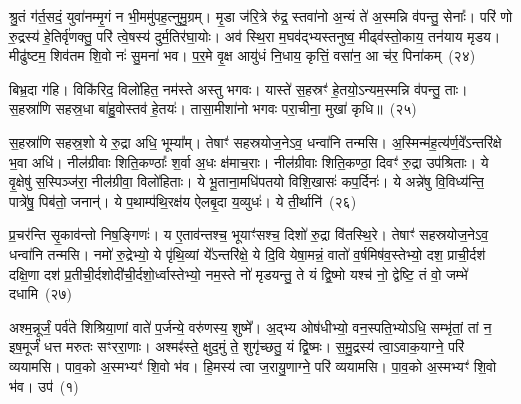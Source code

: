श्रु॒तं ग॑र्त॒सदं॒ युवा॑नम्मृ॒गं न भी॒ममु॑पह॒त्नुमु॒ग्रम्। मृ॒डा ज॑रि॒त्रे रु॑द्र॒ स्तवा॑नो अ॒न्यं ते॑ अ॒स्मन्नि व॑पन्तु॒ सेनाः᳚। परि॑ णो रु॒द्रस्य॑ हे॒तिर्वृ॑णक्तु॒ परि॑ त्वे॒षस्य॑ दुर्म॒तिर॑घा॒योः। अव॑ स्थि॒रा म॒घव॑द्भ्यस्तनुष्व॒ मीढ्व॑स्तो॒काय॒ तन॑याय मृडय। मीढु॑ष्टम॒ शिव॑तम शि॒वो नः॑ सु॒मना॑ भव। प॒र॒मे वृ॒क्ष आयु॑धं नि॒धाय॒ कृत्तिं॒ वसा॑न॒ आ च॑र॒ पिना॑कम्~(२४)

बिभ्र॒दा ग॑हि। विकि॑रिद॒ विलो॑हित॒ नम॑स्ते अस्तु भगवः। यास्ते॑ स॒हस्रꣳ॑ हे॒तयो॒\-ऽन्यम॒स्मन्नि व॑पन्तु॒ ताः। स॒हस्रा॑णि सहस्र॒धा बा॑हु॒वोस्तव॑ हे॒तयः॑। तासा॒मीशा॑नो भगवः परा॒चीना॒ मुखा॑ कृधि॥~(२५)

{\anuvakamend[{अ॒स्मिꣴ स्त॒नुवः॑ स्तु॒हि पिना॑क॒मेका॒न्नत्रि॒ꣳ॒शच्च॑}]}%

स॒हस्रा॑णि सहस्र॒शो ये रु॒द्रा अधि॒ भूम्या᳚म्। तेषाꣳ॑ सहस्रयोज॒ने\-ऽव॒ धन्वा॑नि तन्मसि। अ॒स्मिन्म॑ह॒त्य॑र्ण॒वे᳚\-ऽ\-न्तरि॑क्षे भ॒वा अधि॑। नील॑ग्रीवाः शिति॒कण्ठाः᳚ श॒र्वा अ॒धः क्ष॑माच॒राः। नील॑ग्रीवाः शिति॒कण्ठा॒ दिवꣳ॑ रु॒द्रा उप॑श्रिताः। ये वृ॒क्षेषु॑ स॒स्पिञ्ज॑रा॒ नील॑ग्रीवा॒ विलो॑हिताः। ये भू॒ताना॒मधि॑पतयो विशि॒खासः॑ कप॒र्दिनः॑। ये अन्ने॑षु वि॒विध्य॑न्ति॒ पात्रे॑षु॒ पिब॑तो॒ जनान्॑। ये प॒थाम्प॑थि॒रक्ष॑य ऐलबृ॒दा य॒व्युधः॑। ये ती॒र्थानि॑~(२६)

प्र॒चर॑न्ति सृ॒काव॑न्तो निष॒ङ्गिणः॑। य ए॒ताव॑न्तश्च॒ भूयाꣳ॑सश्च॒ दिशो॑ रु॒द्रा वि॑तस्थि॒रे। तेषाꣳ॑ सहस्रयोज॒ने\-ऽव॒ धन्वा॑नि तन्मसि। नमो॑ रु॒द्रेभ्यो॒ ये पृ॑थि॒व्यां ये᳚\-ऽन्तरि॑क्षे॒ ये दि॒वि येषा॒मन्नं॒ वातो॑ व॒र्\mbox{}षमिष॑व॒स्तेभ्यो॒ दश॒ प्राची॒र्दश॑ दक्षि॒णा दश॑ प्र॒तीची॒र्दशोदी॑ची॒र्दशो॒र्ध्वास्तेभ्यो॒ नम॒स्ते नो॑ मृडयन्तु॒ ते यं द्वि॒ष्मो यश्च॑ नो॒ द्वेष्टि॒ तं वो॒ जम्भे॑ दधामि~(२७)


{\anuvakamend[{ती॒र्थानि॒ यश्च॒ षट्च॑}]}%

{}


\setcounter{anuvakam}{0}
अश्म॒न्नूर्जं॒ पर्व॑ते शिश्रिया॒णां वाते॑ प॒र्जन्ये॒ वरु॑णस्य॒ शुष्मे᳚। अ॒द्भ्य ओष॑धीभ्यो॒ वन॒स्पति॒भ्यो\-ऽधि॒ सम्भृ॑तां॒ तां न॒ इष॒मूर्जं॑ धत्त मरुतः सꣳररा॒णाः। अश्मꣴ॑स्ते॒ क्षुद॒मुं ते॒ शुगृ॑च्छतु॒ यं द्वि॒ष्मः। स॒मु॒द्रस्य॑ त्वा॒\-ऽवाक॒याग्ने॒ परि॑ व्ययामसि। पाव॒को अ॒स्मभ्यꣳ॑ शि॒वो भ॑व। हि॒मस्य॑ त्वा ज॒रायु॒णाग्ने॒ परि॑ व्ययामसि। पा॒व॒को अ॒स्मभ्यꣳ॑ शि॒वो भ॑व। उप॑~(१)


